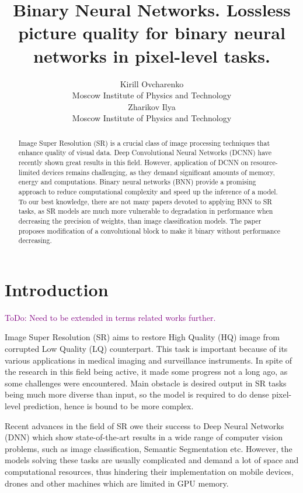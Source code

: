 \documentclass{article}
\title{Binary Neural Networks. Lossless picture quality for binary neural networks in pixel-level tasks.}
\author{Kirill Ovcharenko \\
	Moscow Institute of Physics and Technology\\
	\And
	Zharikov Ilya \\
	Moscow Institute of Physics and Technology\\
}
\date{}
\newcommand{\TODO}[1]{\textcolor{purple}{ToDo: #1.}}
\begin{document}
\maketitle

\begin{abstract}
Image Super Resolution (SR) is a crucial class of image processing techniques that enhance quality of visual data. 
Deep Convolutional Neural Networks (DCNN) have recently shown great results in this field. However, application of DCNN on resource-limited devices remains challenging, as they demand significant amounts of memory, energy and computations. Binary neural networks (BNN) provide a promising approach to reduce computational complexity and speed up the inference of a model. To our best knowledge, there are not many papers devoted to applying BNN to SR tasks, as SR models are much more vulnerable to degradation in performance when decreasing the precision of weights, than image classification models. The paper proposes modification of a convolutional block to make it binary without performance decreasing.

\end{abstract}



\section{Introduction}

\TODO{Need to be extended in terms related works further}

Image Super Resolution (SR) aims to restore High Quality (HQ) image from corrupted Low Quality (LQ) counterpart. This task is important because of its various applications in medical imaging and surveillance instruments. In spite of the research in this field being active, it made some progress not a long ago, as some challenges were encountered. Main obstacle is desired output in SR tasks being much more diverse than input, so the model is required to do dense pixel-level prediction, hence is bound to be more complex.  

Recent advances in the field of SR owe their success to Deep Neural Networks (DNN) which show state-of-the-art results in a wide range of computer vision problems, such as image classification, Semantic Segmentation etc. However, the models solving these tasks are usually complicated and demand a lot of space and computational resources, thus hindering their implementation on mobile devices, drones and other machines which are limited in GPU memory.
\end{document}
